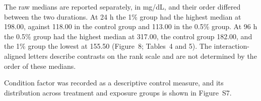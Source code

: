 \documentclass[12pt,a4paper]{article}
\begin{document}
The raw medians are reported separately, in mg/dL, and their order differed between the two durations. At 24 h the 1\% group had the highest median at 198.00, against 118.00 in the control group and 113.00 in the 0.5\% group. At 96 h the 0.5\% group had the highest median at 317.00, the control group 182.00, and the 1\% group the lowest at 155.50 (Figure~8; Tables~4 and 5). The interaction-aligned letters describe contrasts on the rank scale and are not determined by the order of these medians.

Condition factor was recorded as a descriptive control measure, and its distribution across treatment and exposure groups is shown in Figure~S7.
\end{document}
